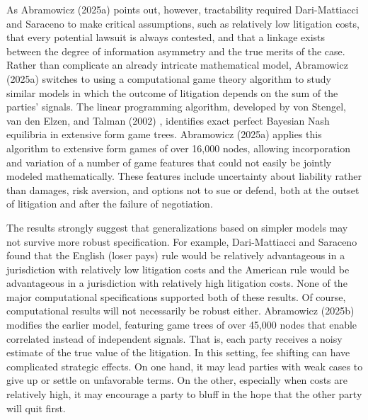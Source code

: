 \documentclass{article}
\begin{document}
As Abramowicz (2025a) \cite{abramowicz2025a} points out, however, tractability required Dari-Mattiacci and Saraceno to make critical assumptions, such as relatively low litigation costs, that every potential lawsuit is always contested, and that a linkage exists between the degree of information asymmetry and the true merits of the case. Rather than complicate an already intricate mathematical model, Abramowicz (2025a) switches to using a computational game theory algorithm to study similar models in which the outcome of litigation depends on the sum of the parties' signals. The linear programming algorithm, developed by von Stengel, van den Elzen, and Talman (2002) \cite{vonstengelvandenelzentalman}, identifies exact perfect Bayesian Nash equilibria in extensive form game trees. Abramowicz (2025a) applies this algorithm to extensive form games of over 16,000 nodes, allowing incorporation and variation of a number of game features that could not easily be jointly modeled mathematically. These features include uncertainty about liability rather than damages, risk aversion, and options not to sue or defend, both at the outset of litigation and after the failure of negotiation.

The results strongly suggest that generalizations based on simpler models may not survive more robust specification. For example, Dari-Mattiacci and Saraceno found that the English (loser pays) rule would be relatively advantageous in a jurisdiction with relatively low litigation costs and the American rule would be advantageous in a jurisdiction with relatively high litigation costs. None of the major computational specifications supported both of these results. Of course, computational results will not necessarily be robust either. Abramowicz (2025b) \cite{abramowicz2025b} modifies the earlier model, featuring game trees of over 45,000 nodes that enable correlated instead of independent signals. That is, each party receives a noisy estimate of the true value of the litigation. In this setting, fee shifting can have complicated strategic effects. On one hand, it may lead parties with weak cases to give up or settle on unfavorable terms. On the other, especially when costs are relatively high, it may encourage a party to bluff in the hope that the other party will quit first. 
\end{document}
